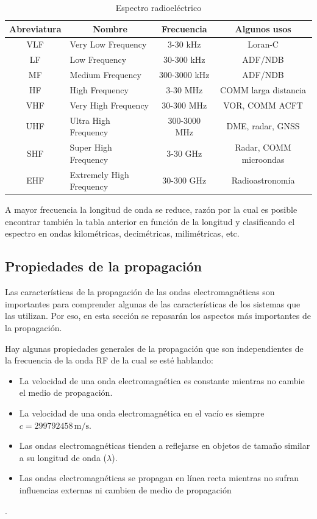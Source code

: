 \begin{table}[!h]
  \centering 
\label{tab:espectro-radioelectrico}
\caption{ Espectro radioel\'ectrico}
  \begin{tabular}{|c|l|c|c|}
 \hline \rowcolor{yellow!30}
{\bf Abreviatura} & \multicolumn{1}{c}{\bf  Nombre}
& {\bf Frecuencia} & {\bf Algunos usos}\\ \hline \hline
VLF 	& Very Low Frequency& 	3-30 kHz &	Loran-C \\ \hline
LF 	&Low Frequency 	&30-300 kHz &	ADF/NDB \\ \hline
MF 	&Medium Frequency 	&300-3000 kHz 	&ADF/NDB \\ \hline
HF 	&High Frequency 	&3-30 MHz 	&COMM larga distancia \\ \hline
VHF 	&Very High Frequency 	&30-300 MHz 	&VOR, COMM ACFT \\ \hline
UHF 	&Ultra High Frequency 	&300-3000 MHz 	&DME, radar, GNSS \\ \hline
SHF 	&Super High Frequency 	&3-30 GHz 	&Radar, COMM microondas \\ \hline
EHF 	&Extremely High Frequency &30-300 GHz 	&Radioastronom\'ia \\ \hline
\end{tabular}  
\end{table}

A mayor frecuencia la longitud de onda se reduce, raz\'on por la cual es posible encontrar tambi\'en la tabla anterior en funci\'on de la longitud y clasificando el espectro en ondas kilom\'etricas, decim\'etricas, milim\'etricas, etc.  	  	 

\subsection{Propiedades de la propagaci\'on}

Las caracter\'isticas de la propagaci\'on de las ondas electromagn\'eticas son importantes para comprender algunas de las caracter\'isticas de los sistemas que las utilizan. Por eso, en esta secci\'on se repasar\'an los aspectos m\'as importantes de la propagaci\'on.

Hay algunas propiedades generales de la propagaci\'on que son independientes de la frecuencia de la onda RF de la cual se est\'e hablando:

\begin{itemize}

\item  La velocidad de una onda electromagn\'etica es constante mientras no
  cambie el medio de propagaci\'on.

  \item La velocidad de una onda electromagn\'etica en el vac\'io es siempre $c
  = 299792458 \,\text{m/s}$.

  \item Las ondas electromagn\'eticas tienden a reflejarse en objetos de
  tama\~no similar a su longitud de onda ($\lambda$).

  \item Las ondas electromagn\'eticas se propagan en l\'inea recta mientras no
  sufran influencias externas ni cambien de medio de propagaci\'on
\end{itemize}
.

